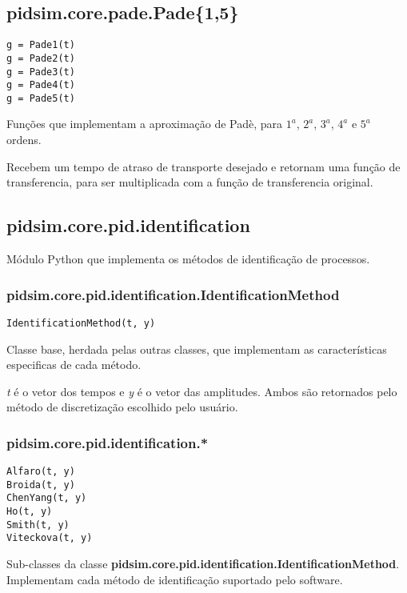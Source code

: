 \subsection{pidsim.core.pade.Pade\{1,5\}}

    \begin{verbatim}
g = Pade1(t)
g = Pade2(t)
g = Pade3(t)
g = Pade4(t)
g = Pade5(t)\end{verbatim}
    
    Funções que implementam a aproximação de Padè, para $1^a$, $2^a$, $3^a$,
    $4^a$ e $5^a$ ordens.
    
    Recebem um tempo de atraso de transporte desejado e retornam uma
    função de transferencia, para ser multiplicada com a função de transferencia
    original.

\subsection{pidsim.core.pid.identification}
    
    Módulo Python que implementa os métodos de identificação de processos.
    
    \subsubsection{pidsim.core.pid.identification.IdentificationMethod}
        
        \begin{verbatim}
IdentificationMethod(t, y)\end{verbatim}
        
        Classe base, herdada pelas outras classes, que implementam as
        características especificas de cada método.
        
        \textit{t} é o vetor dos tempos e \textit{y} é o vetor das amplitudes.
        Ambos são retornados pelo método de discretização escolhido pelo
        usuário.
    
    \subsubsection{pidsim.core.pid.identification.*}
        
        \begin{verbatim}
Alfaro(t, y)
Broida(t, y)
ChenYang(t, y)
Ho(t, y)
Smith(t, y)
Viteckova(t, y)\end{verbatim}
        
        Sub-classes da classe \textbf{pidsim.core.pid.identification.IdentificationMethod}.
        Implementam cada método de identificação suportado pelo software.

